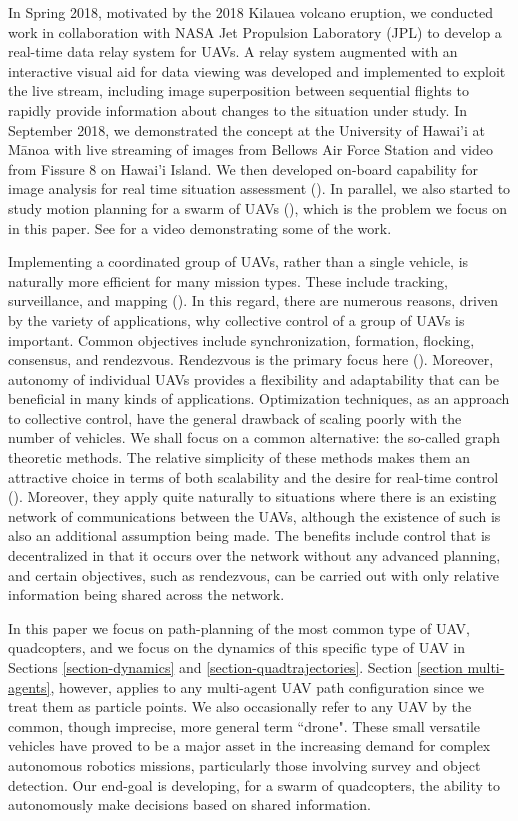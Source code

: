 \documentclass{aims}
\theoremstyle{definition}
\begin{document}
In Spring 2018, motivated by the 2018 Kilauea volcano eruption, we conducted work in collaboration with NASA Jet Propulsion Laboratory (JPL) to develop a real-time data relay system for UAVs.
A relay system augmented with an interactive visual aid for data viewing was developed and implemented to exploit the live stream, including image superposition between sequential flights to rapidly provide information about changes to the situation under study. In September 2018, we demonstrated the concept at the University of Hawai’i at M\=anoa with live streaming of images from Bellows Air Force Station and video from Fissure 8 on Hawai’i Island. We then developed on-board capability for image analysis for real time situation assessment (\cite{IGARSS}). In parallel, we also started to study motion planning for a swarm of UAVs (\cite{IGARSS2}), which is the problem we focus on in this paper. See \cite{Videodrones} for a video demonstrating some of the work.  

Implementing a coordinated group of UAVs, rather than a single vehicle, is naturally more efficient for many mission types. These include tracking, surveillance, and mapping  (\cite{AerialSwarm}). In this regard, there are numerous reasons, driven by the variety of applications, why collective control of a group of UAVs is important. Common objectives include synchronization, formation, flocking, consensus, and rendezvous. Rendezvous is the primary focus here (\cite{CollectiveControl}). Moreover, autonomy of individual UAVs provides a flexibility and adaptability that can be beneficial in many kinds of applications. Optimization techniques, as an approach to collective control, have the general drawback of scaling poorly with the number of vehicles. We shall focus on a common alternative: the so-called graph theoretic methods. The relative simplicity of these methods makes them an attractive choice in terms of both scalability and the desire for real-time control (\cite{Meshabi,PathPlanning}). Moreover, they apply quite naturally to situations where there is an existing network of communications between the UAVs, although the existence of such is also an additional assumption being made. The benefits include control that is decentralized in that it occurs over the network without any advanced planning, and certain objectives, such as rendezvous, can be carried out with only relative information being shared across the network.

In this paper we focus on path-planning of the most common type of UAV, quadcopters, and we focus on the dynamics of this specific type of UAV in Sections \ref{section-dynamics} and \ref{section-quadtrajectories}.  Section \ref{section multi-agents}, however, applies to any multi-agent UAV path configuration since we treat them as particle points. We also occasionally refer to any UAV by the common, though imprecise, more general term ``drone". These small versatile vehicles have proved to be a major asset in the increasing demand for complex autonomous robotics missions, particularly those involving survey and object detection. Our end-goal is developing, for a swarm of quadcopters, the ability to autonomously make decisions based on shared information. 
\end{document}
